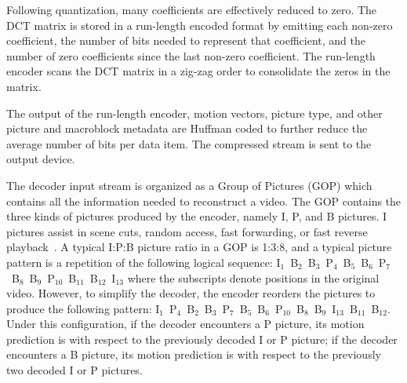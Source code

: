 
Following quantization, many coefficients are effectively reduced to
zero. The DCT matrix is stored in a run-length encoded format by emitting each 
non-zero coefficient, the number of bits needed to represent that coefficient, 
and the number of zero coefficients since the last non-zero coefficient. The
run-length encoder scans the DCT matrix in a zig-zag order
to consolidate the zeros in the matrix.

The output of the run-length encoder, motion vectors, picture type,
and other picture and macroblock metadata are Huffman coded to
further reduce the average number of bits per data item. The compressed
stream is sent to the output device.


The decoder input stream is organized as a Group of Pictures
(GOP) which contains all the information needed to reconstruct a
video. The GOP contains the three kinds of pictures produced by the
encoder, namely I, P, and B pictures. I pictures 
assist in scene cuts, random access, fast forwarding, or fast reverse
playback~\cite{MPEG2}. A typical I:P:B picture ratio in a GOP
is 1:3:8, and a typical picture pattern is a repetition of the
following logical sequence:
I$_1$~B$_2$~B$_3$~P$_4$~B$_5$~B$_6$~P$_7$~B$_8$~B$_9$~P$_{10}$~B$_{11}$~B$_{12}$~I$_{13}$
where the subscripts denote positions in the original video.  However,
to simplify the decoder, the encoder reorders the pictures to produce
the following pattern:
I$_1$~P$_4$~B$_2$~B$_3$~P$_7$~B$_5$~B$_6$~P$_{10}$~B$_8$~B$_9$~I$_{13}$~B$_{11}$~B$_{12}$.
Under this configuration, if the decoder encounters a P picture, its
motion prediction is with respect to the previously decoded I or P
picture; if the decoder encounters a B picture, its motion prediction
is with respect to the previously two decoded I or P pictures.

